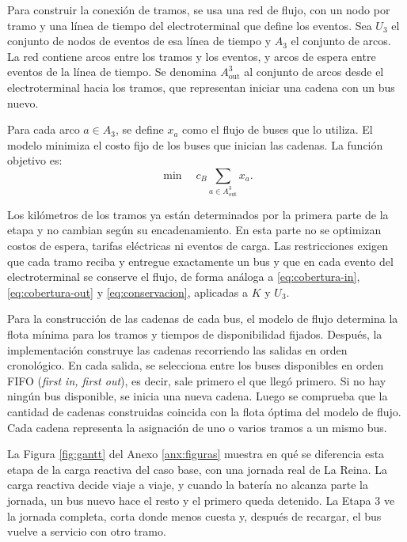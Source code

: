Para construir la conexión de tramos, se usa una red de flujo, con un nodo por tramo y una línea de tiempo del electroterminal que define los eventos. Sea $U_3$ el conjunto de nodos de eventos de esa línea de tiempo y $A_3$ el conjunto de arcos. La red contiene arcos entre los tramos y los eventos, y arcos de espera entre eventos de la línea de tiempo. Se denomina $A_{\mathrm{out}}^3$ al conjunto de arcos desde el electroterminal hacia los tramos, que representan iniciar una cadena con un bus nuevo.

Para cada arco $a \in A_3$, se define $x_a$ como el flujo de buses que lo utiliza. El modelo minimiza el costo fijo de los buses que inician las cadenas. La función objetivo es:
\begin{equation}
\min\quad
c_B\sum_{a\in A_{\mathrm{out}}^3}x_a.
\label{eq:objetivo_reencadenamiento}
\end{equation}

Los kilómetros de los tramos ya están determinados
por la primera parte de la etapa y no cambian según su encadenamiento. En esta parte no se optimizan costos de espera,
tarifas eléctricas ni eventos de carga. Las restricciones exigen que cada tramo reciba y entregue exactamente un bus y que en cada evento del electroterminal se conserve el flujo, de forma análoga a \eqref{eq:cobertura-in}, \eqref{eq:cobertura-out} y \eqref{eq:conservacion}, aplicadas a $K$ y $U_3$.

Para la construcción de las cadenas de cada bus, el modelo de flujo determina la flota mínima
para los tramos y tiempos de disponibilidad fijados.
Después, la implementación construye las cadenas recorriendo las salidas en orden
cronológico. En cada salida, se selecciona entre los buses disponibles en orden FIFO (\textit{first in, first out}), es decir, sale primero el que llegó primero. Si no hay ningún bus disponible, se inicia una nueva cadena. Luego se comprueba que la cantidad de cadenas construidas coincida con la flota óptima del modelo de flujo. Cada cadena representa la asignación de uno o varios tramos a un mismo bus.

La Figura \ref{fig:gantt} del Anexo \ref{anx:figuras} muestra en qué se diferencia esta etapa de la carga reactiva del caso base, con una jornada real de La Reina. La carga reactiva decide viaje a viaje, y cuando la batería no alcanza parte la jornada, un bus nuevo hace el resto y el primero queda detenido. La Etapa 3 ve la jornada completa, corta donde menos cuesta y, después de recargar, el bus vuelve a servicio con otro tramo.


